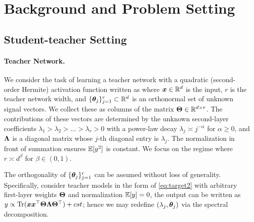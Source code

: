 \section{Background and Problem Setting}
\label{sec:background}

\subsection{Student-teacher Setting}
 
\paragraph{Teacher Network.}  
We consider the task of learning a teacher network with a quadratic (second-order Hermite) activation function written as
where $\boldsymbol{x} \in \mathbb{R}^d$ is the input, $r$ is the teacher network width, and $\{\boldsymbol{\theta}_j\}_{j=1}^{r} \subset \mathbb{R}^d$ is an orthonormal set of unknown signal vectors. We collect these as columns of the matrix $\boldsymbol{\Theta} \in \mathbb{R}^{d \times r}$. The contributions of these vectors are determined by the unknown second-layer coefficients $\lambda_1 > \lambda_2 > \dots > \lambda_{r} > 0$ with a power-law decay $\lambda_j  \asymp j^{-\alpha}$ for $\alpha\geq 0$, and $\boldsymbol{\Lambda}$ is a diagonal matrix whose $j$-th diagonal entry is $\lambda_j$. 
The normalization in front of summation ensures $\mathbb{E}[y^2]$ is constant.
We focus on the regime where $r \asymp d^\beta$ for $\beta \in (0,1)$.

\begin{remark}
The orthogonality of $\{\boldsymbol{\theta}_j\}_{j=1}^r$ can be assumed without loss of generality. Specifically, consider teacher models in the form of \eqref{eq:target2} with arbitrary first-layer weights $\boldsymbol{\Theta}$ and normalization $\mathbb{E}[y]=0$, the output can be written as $y\propto\mathrm{Tr}(\boldsymbol{x}\boldsymbol{x}^\top\boldsymbol{\Theta}\boldsymbol{\Lambda}\boldsymbol{\Theta}^\top) + cst$; hence we may redefine $(\lambda_j,\boldsymbol{\theta}_j)$ via the spectral decomposition. 
\end{remark}


